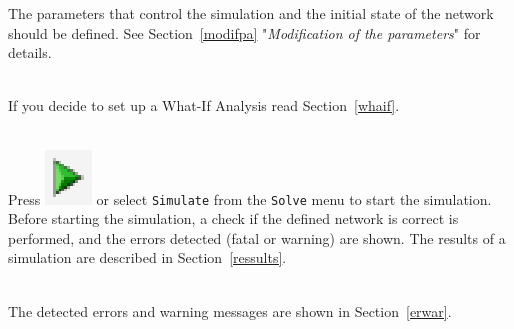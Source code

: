 
The parameters that control the simulation and the initial state
of the network should be defined. See Section~\ref{modifpa}
"\emph{Modification of the parameters}" for details.

\\
If you decide to set up a What-If Analysis read
Section~\ref{whaif}.

\\
Press
\includegraphics[scale=.5]{img/jsimg/play} or select
\texttt{Simulate} from the \texttt{Solve} menu to start the
simulation.  Before starting the simulation, a check if the
defined network is correct is performed, and the errors detected
(fatal or warning) are shown.  The results of a simulation are
described in Section~\ref{ressults}.

\\
The detected errors and warning messages are shown in
Section~\ref{erwar}.\\



